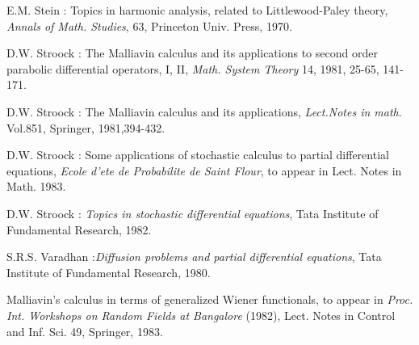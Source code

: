 \begin{thebibliography}{99}
 {E.M. Stein :} Topics in harmonic analysis, related to
  Littlewood-Paley theory, \textit{Annals of Math. Studies}, 63,
  Princeton Univ. Press, 1970. 

 {D.W. Stroock :} The Malliavin calculus and its
  applications to second order parabolic differential operators, I, II,
  \textit{Math. System Theory} 14, 1981, 25-65, 141-171. 

 {D.W. Stroock :} The Malliavin calculus and its
  applications, \textit{Lect.Notes in math}. Vol.851, Springer,
  1981,394-432. 

 {D.W. Stroock :} Some applications of stochastic calculus
  to partial differential equations, \textit{ Ecole d'ete de
    Probabilite de Saint Flour}, to appear in Lect. Notes in
  Math. 1983. 

 {D.W. Stroock :} \textit{Topics in stochastic differential
  equations}, Tata Institute of Fundamental Research, 1982. 

  {S.R.S. Varadhan :}\pageoriginale \textit{Diffusion
   problems and partial differential equations}, Tata Institute of
   Fundamental Research, 1980. 

 Malliavin's calculus in terms of generalized
  Wiener functionals, to appear in \textit{Proc. Int. Workshops on
    Random Fields at Bangalore} (1982), Lect. Notes in Control and
  Inf. Sci. 49, Springer, 1983. 
\end{thebibliography}
